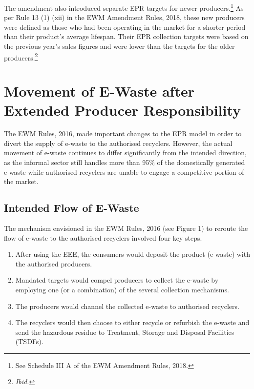 \documentclass[a4paper, 12pt]{article}
\begin{document}
                    The amendment also introduced separate EPR targets for newer producers.\footnote{See Schedule III A of the EWM Amendment Rules, 2018.} As per Rule 13 (1) (xii) in the EWM Amendment Rules, 2018, these new producers were defined as those who had been operating in the market for a shorter period than their product’s average lifespan. Their EPR collection targets were based on the previous year’s sales figures and were lower than the targets for the older producers.\footnote{\textit{Ibid.}}                      
                    
                    
                    \section{Movement of E-Waste after Extended Producer Responsibility}\label{sec:2}
                    
                    The EWM Rules, 2016, made important changes to the EPR model in order to divert the supply of e-waste to the authorised recyclers. However, the actual movement of e-waste continues to differ significantly from the intended direction, as the informal sector still handles more than 95\% of the domestically generated e-waste \parencite{assochamstats} while authorised recyclers are unable to engage a competitive portion of the market.
                                  
                    \subsection{Intended Flow of E-Waste}
                    
                    The mechanism envisioned in the EWM Rules, 2016 (see Figure 1) to reroute the flow of e-waste to the authorised recyclers involved four key steps.                     
                    \begin{enumerate}
                      \item After using the EEE, the consumers would deposit the product (e-waste) with the authorised producers.
                      \item Mandated targets would compel producers to collect the e-waste by employing one (or a combination) of the several collection mechanisms. 
                      \item The producers would channel the collected e-waste to authorised recyclers.
                      \item The recyclers would then choose to either recycle or refurbish the e-waste and send the hazardous residue to Treatment, Storage and Disposal Facilities (TSDFs).
                    \end{enumerate}
                    
\end{document}
